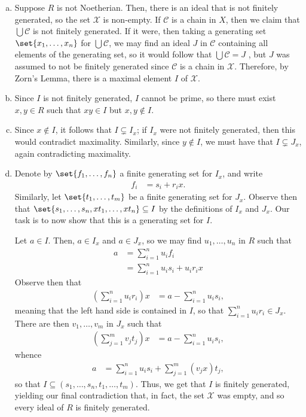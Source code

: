 \documentclass[10pt]{mypackage}
\begin{document}
\begin{solution}\hfill
  \begin{enumerate}[(a)]
    \item Suppose $R$ is not Noetherian. Then, there is an ideal that is not finitely generated, so the set $ \mathcal{X} $ is non-empty. If $\mathcal{C}$ is a chain in $X$, then we claim that $ \bigcup \mathcal{C} $ is not finitely generated. If it were, then taking a generating set $\set{x_1,\dots,x_n}$ for $ \bigcup \mathcal{C} $, we may find an ideal $J$ in $ \mathcal{C} $ containing all elements of the generating set, so it would follow that $ \bigcup \mathcal{C} = J$ , but $J$ was assumed to not be finitely generated since $ \mathcal{C} $ is a chain in $ \mathcal{X} $. Therefore, by Zorn's Lemma, there is a maximal element $I$ of $ \mathcal{X} $.
    \item Since $I$ is not finitely generated, $I$ cannot be prime, so there must exist $x,y\in R$ such that $xy\in I$ but $x,y\notin I$.
    \item Since $x\notin I$, it follows that $I\subsetneq I_x$; if $I_x$ were not finitely generated, then this would contradict maximality. Similarly, since $y\notin I$, we must have that $I\subsetneq J_x$, again contradicting maximality. 
    \item Denote by $\set{f_1,\dots,f_n}$ a finite generating set for $I_x$, and write
      \begin{align*}
        f_i &= s_i + r_i x.
      \end{align*}
      Similarly, let $\set{t_1,\dots,t_m}$ be a finite generating set for $J_x$. Observe then that $\set{s_1,\dots,s_n,xt_1,\dots,xt_n}\subseteq I$ by the definitions of $I_x$ and $J_x$. Our task is to now show that this is a generating set for $I$.

      Let $a\in I$. Then, $a\in I_x$ and $a\in J_x$, so we may find $u_1,\dots,u_n$ in $R$ such that
      \begin{align*}
        a &= \sum_{i=1}^{n}u_if_i\\
          &= \sum_{i=1}^{n}u_is_i + u_ir_ix
      \end{align*}
      Observe then that
      \begin{align*}
        \left( \sum_{i=1}^{n}u_ir_i \right)x &= a-\sum_{i=1}^{n}u_is_i,
      \end{align*}
      meaning that the left hand side is contained in $I$, so that $\sum_{i=1}^{n}u_ir_i\in J_x$. There are then $v_1,\dots,v_m$ in $J_x$ such that
      \begin{align*}
        \left( \sum_{j=1}^{m}v_jt_j \right)x &= a - \sum_{i=1}^{n}u_is_i,
      \end{align*}
      whence
      \begin{align*}
        a &= \sum_{i=1}^{n} u_is_i + \sum_{j=1}^{m} \left( v_j x \right)t_j,
      \end{align*}
      so that $I\subseteq \left( s_1,\dots,s_n,t_1,\dots,t_m \right)$. Thus, we get that $I$ is finitely generated, yielding our final contradiction that, in fact, the set $ \mathcal{X} $ was empty, and so every ideal of $R$ is finitely generated.
  \end{enumerate}
\end{solution}
\end{document}
